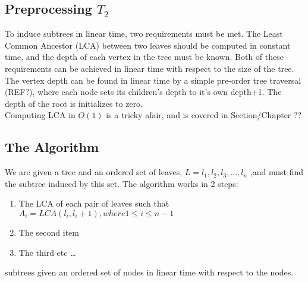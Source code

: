 \subsection{Preprocessing $T_2$}
To induce subtrees in linear time, two requirements must be met. The Least Common Ancestor (LCA) between two leaves should be computed in constant time, and the depth of each vertex in the tree must be known. Both of these requirements can be achieved in linear time with respect to the size of the tree. 
\\
The vertex depth can be found in linear time by a simple pre-order tree traversal (REF?), where each node sets its children's depth to it's own depth+1. The depth of the root is initializes to zero.  
\\
Computing LCA in $O(1)$ is a tricky afair, and is covered in Section/Chapter ??

\subsection{The Algorithm}
We are given a tree and an ordered set of leaves, $L=l_1,l_2,l_3,...,l_n$ ,and must find the subtree induced by this set. The algorithm works in 2 steps:
\begin{enumerate}
	\item The LCA of each pair of leaves such that $A_i=LCA(l_i,l_i+1), where 1 \le i \le n-1$   
	\item The second item
	\item The third etc \ldots
\end{enumerate}


subtrees given an ordered set of nodes in linear time with respect to the nodes.   

\todo{\dots}